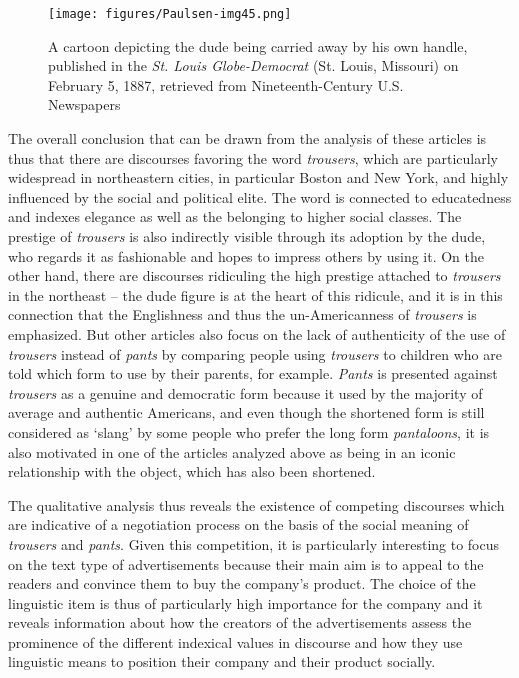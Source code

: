 \begin{figure}
\texttt{[image: figures/Paulsen-img45.png]}
\caption{
A cartoon depicting the dude being carried away by his own handle, published in the \emph{St. Louis Globe-Democrat} (St. Louis, Missouri) on February 5, 1887, retrieved from Nineteenth-Century U.S. Newspapers
}
\label{fig:key:45}
\end{figure}

The overall conclusion that can be drawn from the analysis of these articles is thus that there are discourses favoring the word \emph{trousers}, which are particularly widespread in northeastern cities, in particular Boston and New York, and highly influenced by the social and political elite. The word is connected to educatedness and indexes elegance as well as the belonging to higher social classes. The prestige of \emph{trousers} is also indirectly visible through its adoption by the dude, who regards it as fashionable and hopes to impress others by using it. On the other hand, there are discourses ridiculing the high prestige attached to \emph{trousers} in the northeast – the dude figure is at the heart of this ridicule, and it is in this connection that the Englishness and thus the un-Americanness of \emph{trousers} is emphasized. But other articles also focus on the lack of authenticity of the use of \emph{trousers} instead of \emph{pants} by comparing people using \emph{trousers} to children who are told which form to use by their parents, for example. \emph{Pants} is presented against \emph{trousers} as a genuine and democratic form because it used by the majority of average and authentic Americans, and even though the shortened form is still considered as ‘slang’ by some people who prefer the long form \emph{pantaloons}, it is also motivated in one of the articles analyzed above as being in an iconic relationship with the object, which has also been shortened.


The qualitative analysis thus reveals the existence of competing discourses which are indicative of a negotiation process on the basis of the social meaning of \emph{trousers} and \emph{pants}. Given this competition, it is particularly interesting to focus on the text type of advertisements because their main aim is to appeal to the readers and convince them to buy the company’s product. The choice of the linguistic item is thus of particularly high importance for the company and it reveals information about how the creators of the advertisements assess the prominence of the different indexical values in discourse and how they use linguistic means to position their company and their product socially.

